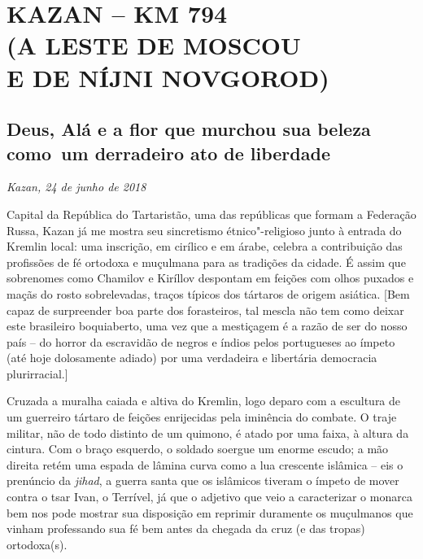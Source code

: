 \movetooddpage
{}
\part*{KAZAN -- KM 794\\(A LESTE DE MOSCOU\\E DE NÍJNI NOVGOROD)}


\chapter*{Deus, Alá e a flor que murchou sua beleza como~um derradeiro ato de liberdade}

\begin{flushright}
\emph{Kazan, 24 de junho de 2018}
\end{flushright}

Capital da República do Tartaristão, uma das repúblicas que formam a
Federação Russa, Kazan já me mostra seu sincretismo étnico"-religioso
junto à entrada do Kremlin local: uma inscrição, em cirílico e em árabe,
celebra a contribuição das profissões de fé ortodoxa e muçulmana para as
tradições da cidade. É assim que sobrenomes como Chamilov e Kiríllov
despontam em feições com olhos puxados e maçãs do rosto sobrelevadas,
traços típicos dos tártaros de origem asiática. {[}Bem capaz de
surpreender boa parte dos forasteiros, tal mescla não tem como deixar
este brasileiro boquiaberto, uma vez que a mestiçagem é a razão de ser
do nosso país -- do horror da escravidão de negros e índios pelos
portugueses ao ímpeto (até hoje dolosamente adiado) por uma verdadeira e
libertária democracia plurirracial.{]}

Cruzada a muralha caiada e altiva do Kremlin, logo deparo com a
escultura de um guerreiro tártaro de feições enrijecidas pela iminência
do combate. O traje militar, não de todo distinto de um quimono, é atado
por uma faixa, à altura da cintura. Com o braço esquerdo, o soldado
soergue um enorme escudo; a mão direita retém uma espada de lâmina curva
como a lua crescente islâmica -- eis o prenúncio da \emph{jihad}, a
guerra santa que os islâmicos tiveram o ímpeto de mover contra o tsar
Ivan, o Terrível, já que o adjetivo que veio a caracterizar o monarca
bem nos pode mostrar sua disposição em reprimir duramente os muçulmanos
que vinham professando sua fé bem antes da chegada da cruz (e das
tropas) ortodoxa(s).

